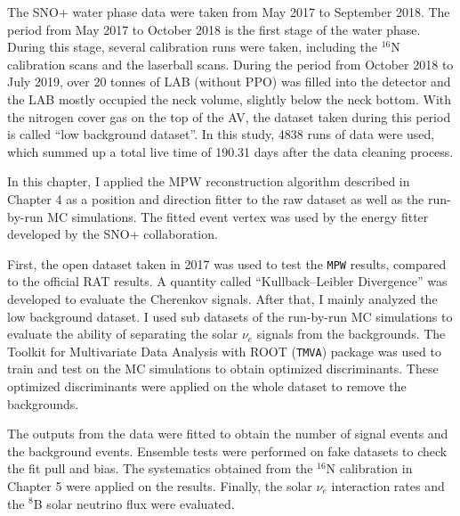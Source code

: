
The SNO+ water phase data were taken from May 2017 to September 2018. The period from May 2017 to October 2018 is the first stage of the water phase. During this stage, several calibration runs were taken, including the $^{16}$N calibration scans and the laserball scans. During the period from October 2018 to July 2019, over 20 tonnes of LAB (without PPO) was filled into the detector and the LAB mostly occupied the neck volume, slightly below the neck bottom. With the nitrogen cover gas on the top of the AV, the dataset taken during this period is called ``low background dataset''. In this study, 4838 runs of data were used, which summed up a total live time of 190.31 days after the data cleaning process.
 
In this chapter, I applied the MPW reconstruction algorithm described in Chapter 4 as a position and direction fitter to the raw dataset as well as the run-by-run MC simulations. The fitted event vertex was used by the energy fitter developed by the SNO+ collaboration.  

First, the open dataset taken in 2017 was used to test the \texttt{MPW} results, compared to the official RAT results. A quantity called ``Kullback–Leibler Divergence'' was developed to evaluate the Cherenkov signals. After that, I mainly analyzed the low background dataset. I used sub datasets of the run-by-run MC simulations to evaluate the ability of separating the solar $\nu_e$ signals from the backgrounds. The Toolkit for Multivariate Data Analysis with ROOT (\texttt{TMVA}) package \cite{tmvaWebsite,albertsson2007tmva} was used to train and test on the MC simulations to obtain optimized discriminants. These optimized discriminants were applied on the whole dataset to remove the backgrounds.

The outputs from the data were fitted to obtain the number of signal events and the background events. Ensemble tests were performed on fake datasets to check the fit pull and bias. The systematics obtained from the $^{16}$N calibration in Chapter 5 were applied on the results. Finally, the solar $\nu_e$ interaction rates and the $^8$B solar neutrino flux were evaluated.


